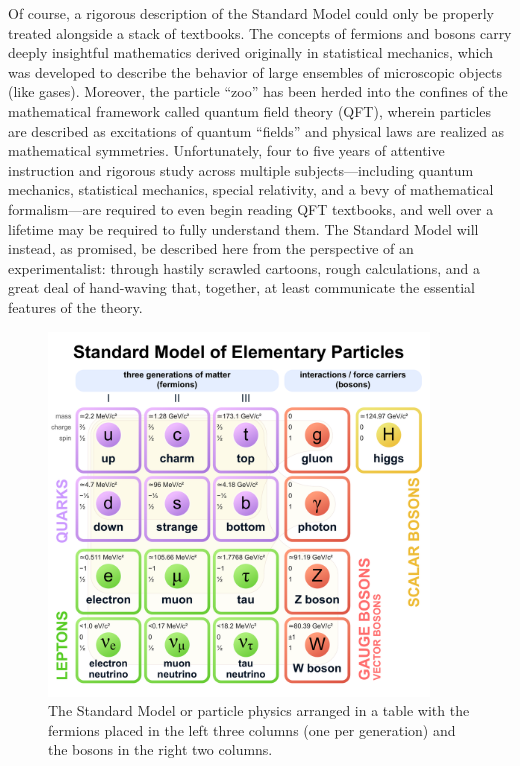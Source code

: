Of course, a rigorous description of the Standard Model could only be properly treated alongside a stack of textbooks. 
The concepts of fermions and bosons carry deeply insightful mathematics derived originally in statistical mechanics, which was developed to describe the behavior of large ensembles of microscopic objects (like gases). 
Moreover, the particle ``zoo'' has been herded into the confines of the mathematical framework called quantum field theory (QFT), wherein particles are described as excitations of quantum ``fields'' and physical laws are realized as mathematical symmetries. 
Unfortunately, four to five years of attentive instruction and rigorous study across multiple subjects---including quantum mechanics, statistical mechanics, special relativity, and a bevy of mathematical formalism---are required to even begin reading QFT textbooks, and well over a lifetime may be required to fully understand them\footnotemark{}. 
The Standard Model will instead, as promised, be described here from the perspective of an experimentalist: through hastily scrawled cartoons, rough calculations, and a great deal of hand-waving that, together, at least communicate the essential features of the theory. 

\begin{figure}[htb]
    \centering
    \includegraphics[width=0.9\textwidth]{fig/standard_model.pdf}
    \caption{
        The Standard Model or particle physics arranged in a table with the fermions placed in the left three columns (one per generation) and the bosons in the right two columns.
    }
    \label{fig:standard_model}
\end{figure}


